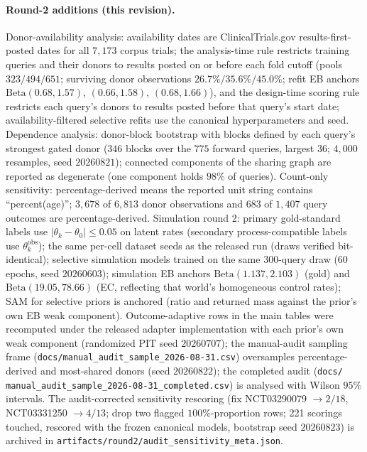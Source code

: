 \documentclass[11pt]{article}
\begin{document}
\paragraph{Round-2 additions (this revision).} Donor-availability analysis:
availability dates are ClinicalTrials.gov results-first-posted dates for all
$7{,}173$ corpus trials; the analysis-time rule restricts training queries and
their donors to results posted on or before each fold cutoff (pools
$323/494/651$; surviving donor observations $26.7\%/35.6\%/45.0\%$; refit EB
anchors $\mathrm{Beta}(0.68,1.57)$, $(0.66,1.58)$, $(0.68,1.66)$), and the
design-time scoring rule restricts each query's donors to results posted
before that query's start date; availability-filtered selective refits use
the canonical hyperparameters and seed. Dependence analysis: donor-block
bootstrap with blocks defined by each query's strongest gated donor ($346$
blocks over the $775$ forward queries, largest $36$; $4{,}000$ resamples,
seed $20260821$); connected components of the sharing graph are reported as
degenerate (one component holds $98\%$ of queries). Count-only sensitivity:
percentage-derived means the reported unit string contains
``percent(age)''; $3{,}678$ of $6{,}813$ donor observations and $683$ of
$1{,}407$ query outcomes are percentage-derived. Simulation round 2: primary
gold-standard labels use $|\theta_k - \theta_0| \le 0.05$ on latent rates
(secondary process-compatible labels use $\theta^{\mathrm{obs}}_k$); the
same per-cell dataset seeds as the released run (draws verified
bit-identical); selective simulation models trained on the same
$300$-query draw ($60$ epochs, seed $20260603$); simulation EB anchors
$\mathrm{Beta}(1.137, 2.103)$ (gold) and $\mathrm{Beta}(19.05, 78.66)$ (EC,
reflecting that world's homogeneous control rates); SAM for selective priors
is anchored (ratio and returned mass against the prior's own EB weak
component). Outcome-adaptive rows in the main tables were recomputed under
the released adapter implementation with each prior's own weak component
(randomized PIT seed $20260707$); the manual-audit sampling frame
(\texttt{docs/\allowbreak manual\_audit\_sample\_2026-08-31.csv}) oversamples
percentage-derived and most-shared donors (seed $20260822$); the completed
audit (\texttt{docs/} \texttt{manual\_audit\_sample\_2026-08-31\_completed.csv})
is analysed with Wilson $95\%$ intervals. The audit-corrected
sensitivity rescoring (fix
NCT03290079 $\to 2/18$, NCT03331250 $\to 4/13$;
drop two flagged $100\%$-proportion rows; 221 scorings touched, rescored
with the frozen canonical models, bootstrap seed $20260823$) is archived in
\texttt{artifacts/\allowbreak round2/audit\_sensitivity\_meta.json}.
\end{document}
